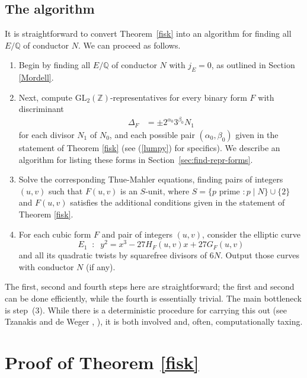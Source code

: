 \documentclass[11pt]{report}
\theoremstyle{definition}
\begin{document}

\subsection{The algorithm}
\label{sec:algorithm}

It is straightforward to convert Theorem~\ref{fisk} into an algorithm for finding all $E/\mathbb{Q}$ of conductor $N$. We can proceed as follows.
\begin{enumerate}
\item Begin by finding all $E/\mathbb{Q}$ of conductor $N$ with $j_E=0$, as outlined in Section \ref{Mordell}.
\item Next, compute $\mbox{GL}_2(\mathbb{Z})$-representatives for every binary form $F$ with discriminant
\begin{align*}
\Delta_F &= \pm 2^{\alpha_0} 3^{\beta_0} N_1
\end{align*}
for each divisor $N_1$ of $N_0$, and each possible pair $(\alpha_0,\beta_0)$ given in the statement of Theorem
\ref{fisk} (see (\ref{lumpy}) for specifics). We describe an algorithm for listing these forms in Section~\ref{sec:find-repr-forms}.
\item Solve the corresponding Thue-Mahler equations, finding pairs of integers $(u,v)$ such that
$F(u,v)$ is an $S$-unit, where $S = \{ p \mbox{ prime } : p \mid N \} \cup \{2 \}$ and $F(u,v)$ satisfies the additional conditions given in the statement of Theorem
\ref{fisk}.
\item For each cubic form $F$ and pair of integers $(u,v)$, consider the elliptic curve
$$
E_1 \; \; : \; \; y^2 = x^3 -27 H_F(u,v) x +27 G_F(u,v)
$$
and all its quadratic twists by squarefree divisors of $6N$. Output those curves with conductor $N$ (if any).
\end{enumerate}
The first, second and fourth steps here are straightforward; the first and second can be done efficiently, while the fourth is essentially
trivial. The main bottleneck is step~(3). While there is a deterministic procedure for carrying this out (see Tzanakis and de
Weger \cite{TW2}, \cite{TW3}), it is both involved and, often, computationally taxing.


\section{Proof of Theorem \autoref{fisk}}
\label{sec:proof-theor-autor}
\end{document}
